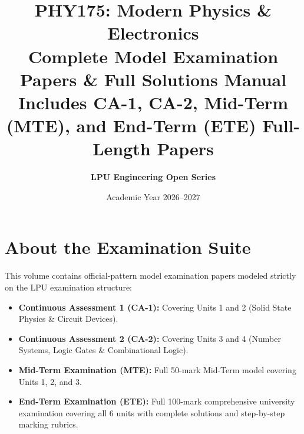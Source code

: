 \documentclass[11pt,a4paper,twoside,openright]{report}
\title{\Huge\bfseries\color{ExamNavy} PHY175: Modern Physics \& Electronics\\[0.5em]
\Large\color{ExamRed} Complete Model Examination Papers \& Full Solutions Manual\\[1em]
\normalsize Includes CA-1, CA-2, Mid-Term (MTE), and End-Term (ETE) Full-Length Papers}
\author{\textbf{LPU Engineering Open Series}}
\date{Academic Year 2026--2027}
\begin{document}
\maketitle

\chapter*{About the Examination Suite}
This volume contains official-pattern model examination papers modeled strictly on the LPU examination structure:
\begin{itemize}
    \item \textbf{Continuous Assessment 1 (CA-1):} Covering Units 1 and 2 (Solid State Physics \& Circuit Devices).
    \item \textbf{Continuous Assessment 2 (CA-2):} Covering Units 3 and 4 (Number Systems, Logic Gates \& Combinational Logic).
    \item \textbf{Mid-Term Examination (MTE):} Full 50-mark Mid-Term model covering Units 1, 2, and 3.
    \item \textbf{End-Term Examination (ETE):} Full 100-mark comprehensive university examination covering all 6 units with complete solutions and step-by-step marking rubrics.
\end{itemize}

\tableofcontents





\end{document}
